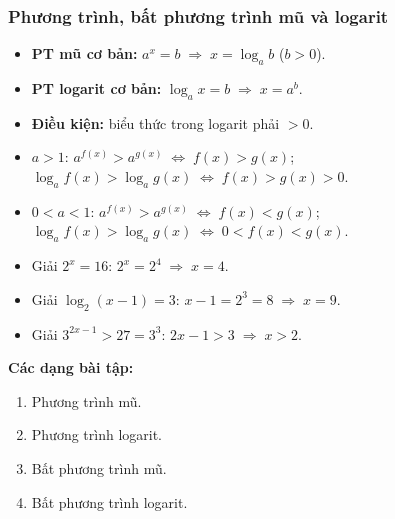 \documentclass[12pt,a4paper]{article}
\begin{document}
\subsubsection{Phương trình, bất phương trình mũ và logarit}

\begin{congthuc}
  \begin{itemize}
    \item \textbf{PT mũ cơ bản:} $a^x = b \;\Rightarrow\; x = \log_a b$ \;($b > 0$).
    \item \textbf{PT logarit cơ bản:} $\log_a x = b \;\Rightarrow\; x = a^b$.
    \item \textbf{Điều kiện:} biểu thức trong logarit phải $> 0$.
  \end{itemize}
\end{congthuc}

\begin{phuongphap}[title={Bất phương trình}]
  \begin{itemize}
    \item $a > 1$:
      \;$a^{f(x)} > a^{g(x)} \;\Leftrightarrow\; f(x) > g(x)$;
      \;\;$\log_a f(x) > \log_a g(x) \;\Leftrightarrow\; f(x) > g(x) > 0$.
    \item $0 < a < 1$:
      \;$a^{f(x)} > a^{g(x)} \;\Leftrightarrow\; f(x) < g(x)$;
      \;\;$\log_a f(x) > \log_a g(x) \;\Leftrightarrow\; 0 < f(x) < g(x)$.
  \end{itemize}
\end{phuongphap}

\begin{vidu}
  \begin{itemize}
    \item Giải $2^x = 16$: \;$2^x = 2^4 \;\Rightarrow\; x = 4$.
    \item Giải $\log_2(x - 1) = 3$: \;$x - 1 = 2^3 = 8 \;\Rightarrow\; x = 9$.
    \item Giải $3^{2x-1} > 27 = 3^3$: \;$2x - 1 > 3 \;\Rightarrow\; x > 2$.
  \end{itemize}
\end{vidu}

\medskip\noindent\textbf{Các dạng bài tập:}
\begin{enumerate}[label=\textbf{Dạng \arabic*:}, leftmargin=*, align=left]
  \item Phương trình mũ.
  \item Phương trình logarit.
  \item Bất phương trình mũ.
  \item Bất phương trình logarit.
\end{enumerate}
\end{document}
